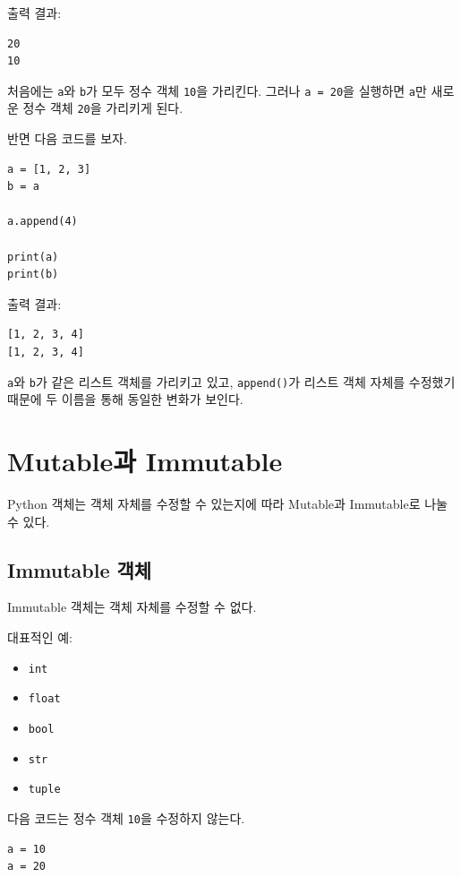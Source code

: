 \documentclass[11pt,a4paper]{article}
\begin{document}
출력 결과:

\begin{verbatim}
20
10
\end{verbatim}

처음에는 \texttt{a}와 \texttt{b}가 모두 정수 객체 \texttt{10}을 가리킨다.
그러나 \texttt{a = 20}을 실행하면 \texttt{a}만 새로운 정수 객체 \texttt{20}을 가리키게 된다.

반면 다음 코드를 보자.

\begin{lstlisting}
a = [1, 2, 3]
b = a

a.append(4)

print(a)
print(b)
\end{lstlisting}

출력 결과:

\begin{verbatim}
[1, 2, 3, 4]
[1, 2, 3, 4]
\end{verbatim}

\texttt{a}와 \texttt{b}가 같은 리스트 객체를 가리키고 있고,
\texttt{append()}가 리스트 객체 자체를 수정했기 때문에 두 이름을 통해 동일한 변화가 보인다.

\section{Mutable과 Immutable}

Python 객체는 객체 자체를 수정할 수 있는지에 따라 Mutable과 Immutable로 나눌 수 있다.

\subsection{Immutable 객체}

Immutable 객체는 객체 자체를 수정할 수 없다.

대표적인 예:

\begin{itemize}
    \item \texttt{int}
    \item \texttt{float}
    \item \texttt{bool}
    \item \texttt{str}
    \item \texttt{tuple}
\end{itemize}

다음 코드는 정수 객체 \texttt{10}을 수정하지 않는다.

\begin{lstlisting}
a = 10
a = 20
\end{lstlisting}
\end{document}
